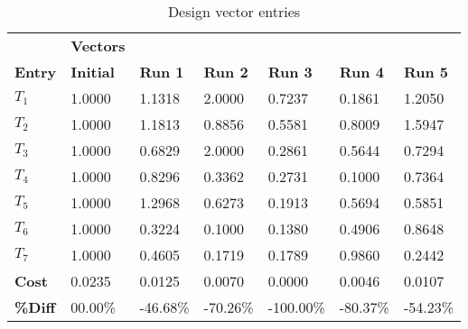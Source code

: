 \begin{table}[H]
\centering
\begin{tabular}{lllllll}
\textbf{} & \cellcolor[HTML]{EFEFEF}\textbf{Vectors} & \textbf{} & \textbf{} & \textbf{} & \textbf{} & \textbf{} \\
\rowcolor[HTML]{EFEFEF} \cellcolor[HTML]{EFEFEF}\textbf{Entry} & \cellcolor[HTML]{EFEFEF}\textbf{Initial} & \cellcolor[HTML]{EFEFEF}\textbf{Run 1} & \cellcolor[HTML]{EFEFEF}\textbf{Run 2} & \cellcolor[HTML]{EFEFEF}\textbf{Run 3} & \cellcolor[HTML]{EFEFEF}\textbf{Run 4} & \cellcolor[HTML]{EFEFEF}\textbf{Run 5} \\
$T_1$ & 1.0000 & 1.1318 & 2.0000 & 0.7237 & 0.1861 & 1.2050 \\
$T_2$ & 1.0000 & 1.1813 & 0.8856 & 0.5581 & 0.8009 & 1.5947 \\
$T_3$ & 1.0000 & 0.6829 & 2.0000 & 0.2861 & 0.5644 & 0.7294 \\
$T_4$ & 1.0000 & 0.8296 & 0.3362 & 0.2731 & 0.1000 & 0.7364 \\
$T_5$ & 1.0000 & 1.2968 & 0.6273 & 0.1913 & 0.5694 & 0.5851 \\
$T_6$ & 1.0000 & 0.3224 & 0.1000 & 0.1380 & 0.4906 & 0.8648 \\
$T_7$ & 1.0000 & 0.4605 & 0.1719 & 0.1789 & 0.9860 & 0.2442 \\
\rowcolor[HTML]{EFEFEF} 
\cellcolor[HTML]{EFEFEF}\textbf{Cost} & \cellcolor[HTML]{EFEFEF}0.0235 & 0.0125 & 0.0070 & 0.0000 & 0.0046 & 0.0107 \\
\rowcolor[HTML]{EFEFEF} 
\cellcolor[HTML]{EFEFEF}\textbf{\%Diff} & \cellcolor[HTML]{EFEFEF} 00.00\% &-46.68\% & -70.26\% & -100.00\% & -80.37\% & -54.23\% \\
\end{tabular}
\caption{Design vector entries}
\label{tab:DesignVectorEntries}
\end{table}
